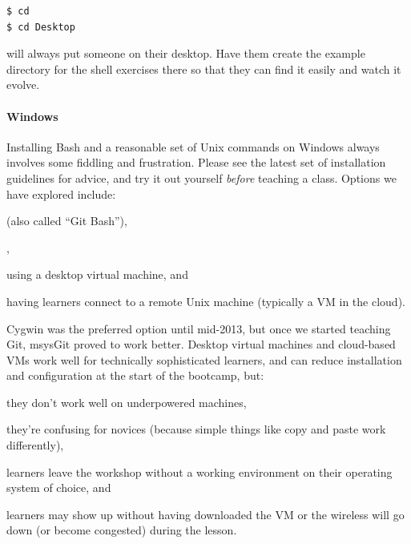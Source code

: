 \documentclass{book}
\begin{document}
\begin{swcitemize}
\begin{verbatim}
$ cd
$ cd Desktop
\end{verbatim}

  will always put someone on their desktop. Have them create the example
  directory for the shell exercises there so that they can find it
  easily and watch it evolve.
\end{swcitemize}

\mbox{}\paragraph{Windows}

Installing Bash and a reasonable set of Unix commands on Windows always
involves some fiddling and frustration. Please see the latest set of
installation guidelines for advice, and try it out yourself
\emph{before} teaching a class. Options we have explored include:

\begin{swcenumerate}
\item
   (also called ``Git Bash''),
\item
  ,
\item
  using a desktop virtual machine, and
\item
  having learners connect to a remote Unix machine (typically a VM in
  the cloud).
\end{swcenumerate}

Cygwin was the preferred option until mid-2013, but once we started
teaching Git, msysGit proved to work better. Desktop virtual machines
and cloud-based VMs work well for technically sophisticated learners,
and can reduce installation and configuration at the start of the
bootcamp, but:

\begin{swcenumerate}
\item
  they don't work well on underpowered machines,
\item
  they're confusing for novices (because simple things like copy and
  paste work differently),
\item
  learners leave the workshop without a working environment on their
  operating system of choice, and
\item
  learners may show up without having downloaded the VM or the wireless
  will go down (or become congested) during the lesson.
\end{swcenumerate}
\end{document}
